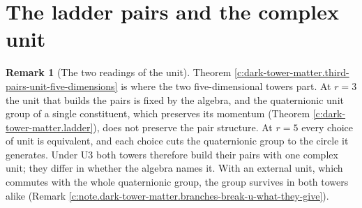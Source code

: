 \documentclass[11pt]{article}
\theoremstyle{definition}
\newtheorem{remark}[theorem]{Remark}
\theoremstyle{plain}
\begin{document}
\section{The ladder pairs and the complex unit}

\begin{remark}[The two readings of the unit]\label{c:note.dark-tower-matter.two-readings-unit}
Theorem \ref{c:dark-tower-matter.third-pairs-unit-five-dimensions} is where the two five-dimensional towers part. At $r = 3$ the unit that builds the pairs is fixed by the algebra, and the quaternionic unit group of a single constituent, which preserves its momentum (Theorem \ref{c:dark-tower-matter.ladder}), does not preserve the pair structure. At $r = 5$ every choice of unit is equivalent, and each choice cuts the quaternionic group to the circle it generates. Under U3 both towers therefore build their pairs with one complex unit; they differ in whether the algebra names it. With an external unit, which commutes with the whole quaternionic group, the group survives in both towers alike (Remark \ref{c:note.dark-tower-matter.branches-break-u-what-they-give}).
\end{remark}
\end{document}
